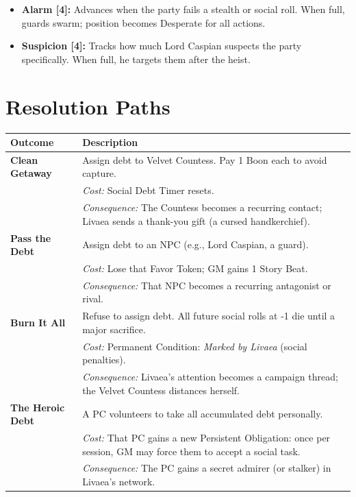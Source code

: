 \documentclass[12pt]{book}
\begin{document}
\begin{itemize}
    \item \textbf{Alarm [4]:} Advances when the party fails a stealth or social roll. When full, guards swarm; position becomes Desperate for all actions.
    \item \textbf{Suspicion [4]:} Tracks how much Lord Caspian suspects the party specifically. When full, he targets them after the heist.
\end{itemize}

\chapter{Resolution Paths}

\begin{longtable}{p{} p{}}
\toprule
\textbf{Outcome} & \textbf{Description} \\
\midrule
\textbf{Clean Getaway} & Assign debt to Velvet Countess. Pay 1 Boon each to avoid capture. \\
& \textit{Cost:} Social Debt Timer resets. \\
& \textit{Consequence:} The Countess becomes a recurring contact; Livaea sends a thank-you gift (a cursed handkerchief). \\
\midrule
\textbf{Pass the Debt} & Assign debt to an NPC (e.g., Lord Caspian, a guard). \\
& \textit{Cost:} Lose that Favor Token; GM gains 1 Story Beat. \\
& \textit{Consequence:} That NPC becomes a recurring antagonist or rival. \\
\midrule
\textbf{Burn It All} & Refuse to assign debt. All future social rolls at -1 die until a major sacrifice. \\
& \textit{Cost:} Permanent Condition: \textit{Marked by Livaea} (social penalties). \\
& \textit{Consequence:} Livaea's attention becomes a campaign thread; the Velvet Countess distances herself. \\
\midrule
\textbf{The Heroic Debt} & A PC volunteers to take all accumulated debt personally. \\
& \textit{Cost:} That PC gains a new Persistent Obligation: once per session, GM may force them to accept a social task. \\
& \textit{Consequence:} The PC gains a secret admirer (or stalker) in Livaea's network. \\
\bottomrule
\end{longtable}
\end{document}
